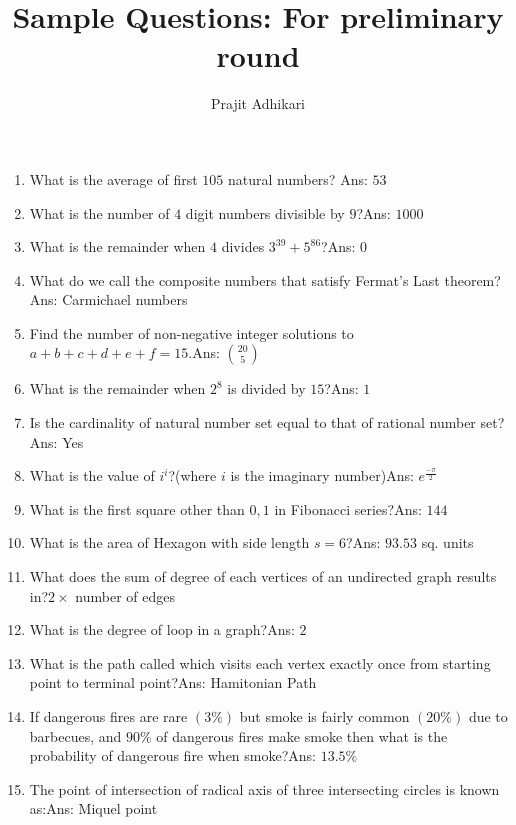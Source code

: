 \documentclass{article} [12 pt]
\begin{document}
\title{Sample Questions: For preliminary round}
\author{Prajit Adhikari}
\maketitle

\begin{enumerate}
    \item What is the average of first $105$ natural numbers?  \newline Ans: $53$
    \item What is the number of $4$ digit numbers divisible by $9$?\newline Ans: $1000$
    \item What is the remainder when $4$ divides $3^{39}+ 5^{86}$?\newline Ans: $0$
    \item What do we call the composite numbers that satisfy Fermat's Last theorem?\newline Ans: Carmichael numbers
    \item Find the number of non-negative integer solutions to $a+b+c+d+e+f=15$.\newline Ans: $20 \choose 5$
    \item What is the remainder when $2^8$ is divided by $15$?\newline Ans: $1$
    \item Is the cardinality of natural number set equal to that of rational number set?\newline Ans: Yes
    \item What is the value of $i^i$?(where $i$ is the imaginary number)\newline Ans: $e^{\frac{-\pi}{2}}$
    \item What is the first square other than $0,1 $ in Fibonacci series?\newline Ans: $144$
    \item What is the area of Hexagon with side length $s=6$?\newline Ans: $93.53$ sq. units
    \item What does the sum of degree of each vertices of an undirected graph results in?\newline $ 2 \times$ number of edges
    \item What is the degree of loop in a graph?\newline Ans: $2$
    \item What is the path called which visits each vertex exactly once from starting point to terminal point?\newline Ans: Hamitonian Path
    \item If dangerous fires are rare $(3\%)$ but smoke is fairly common $(20\%)$ due to barbecues, and $90\%$ of dangerous fires make smoke then what is the probability of dangerous fire when smoke?\newline Ans: $13.5 \%$
    \item The point of intersection of radical axis of three intersecting circles is known as:\newline Ans: Miquel point 
    \end{enumerate}
\end{document}

